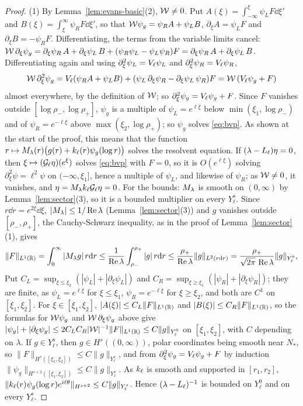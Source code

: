 \begin{proof}
(1) By Lemma~\ref{lem:evans-basic}(2), $\mathcal{W}\ne0$. Put
$A(\xi)=\int_{-\infty}^\xi\psi_LF\dd\xi'$ and $B(\xi)=\int_\xi^\infty\psi_RF\dd\xi'$,
so that $\mathcal{W}\psi_g=\psi_RA+\psi_LB$, $\partial_\xi A=\psi_LF$ and
$\partial_\xi B=-\psi_RF$. Differentiating, the terms from the variable limits
cancel: $\mathcal{W}\,\partial_\xi\psi_g=\partial_\xi\psi_R\,A+\partial_\xi\psi_L\,B+(\psi_R\psi_L-\psi_L\psi_R)F
=\partial_\xi\psi_R\,A+\partial_\xi\psi_L\,B$. Differentiating again and using
$\partial_\xi^2\psi_L=V_\ell\psi_L$ and $\partial_\xi^2\psi_R=V_\ell\psi_R$,
\[
\mathcal{W}\,\partial_\xi^2\psi_g=V_\ell(\psi_RA+\psi_LB)+(\psi_L\,\partial_\xi\psi_R-\partial_\xi\psi_L\,\psi_R)F
=\mathcal{W}\,(V_\ell\psi_g+F)
\]
almost everywhere, by the definition of $\mathcal{W}$; so $\partial_\xi^2\psi_g=V_\ell\psi_g+F$.
Since $F$ vanishes outside $[\log\rho_-,\log\rho_+]$, $\psi_g$ is a multiple of
$\psi_L=e^{\ell\xi}$ below $\min(\xi_1,\log\rho_-)$ and of $\psi_R=e^{-\ell\xi}$ above
$\max(\xi_2,\log\rho_+)$; so $\psi_g$ solves \eqref{eq:bvp}. As shown at the start
of the proof, this means that the function
$r\mapsto M_\lambda(r)\big(g(r)+k_\ell(r)\psi_g(\log r)\big)$ solves the
resolvent equation. If $(\lambda-L_{\ell})\eta=0$, then
$\xi\mapsto(\mathcal{G}_\ell\eta)(e^\xi)$ solves \eqref{eq:bvp} with $F=0$,
so it is $O(e^{\ell\xi})$ solving $\partial_\xi^2\psi=\ell^2\psi$ on $(-\infty,\xi_1]$, hence a
multiple of $\psi_L$, and likewise of $\psi_R$; as $\mathcal{W}\ne0$, it vanishes, and
$\eta=M_\lambda k_\ell\mathcal{G}_\ell\eta=0$. For the bounds: $M_\lambda$ is
smooth on $(0,\infty)$ by Lemma~\ref{lem:sector}(3), so it is a bounded
multiplier on every $Y^s_\ell$. Since $r\dd r=e^{2\xi}\dd\xi$,
$|M_\lambda|\le1/\Re\lambda$ (Lemma~\ref{lem:sector}(3)) and $g$ vanishes outside
$[\rho_-,\rho_+]$, the Cauchy-Schwarz inequality, as in the proof of
Lemma~\ref{lem:sector}(1), gives
\[
\|F\|_{L^1(\mathbb{R})}=\int_0^\infty|M_\lambda g|\,r\dd r
\le\frac1{\Re\lambda}\int_{\rho_-}^{\rho_+}|g|\,r\dd r
\le\frac{\rho_+}{\Re\lambda}\|g\|_{L^2(r\dd r)}
=\frac{\rho_+}{\sqrt{2\pi}\,\Re\lambda}\|g\|_{Y^0_\ell},
\]
Put $C_L=\sup_{\xi\le\xi_2}(|\psi_L|+|\partial_\xi\psi_L|)$ and
$C_R=\sup_{\xi\ge\xi_1}(|\psi_R|+|\partial_\xi\psi_R|)$; they are finite, as
$\psi_L=e^{\ell\xi}$ for $\xi\le\xi_1$, $\psi_R=e^{-\ell\xi}$ for $\xi\ge\xi_2$, and
both are $C^1$ on $[\xi_1,\xi_2]$. For $\xi\in[\xi_1,\xi_2]$,
$|A(\xi)|\le C_L\|F\|_{L^1(\mathbb{R})}$ and $|B(\xi)|\le C_R\|F\|_{L^1(\mathbb{R})}$, so the
formulas for $\mathcal{W}\psi_g$ and $\mathcal{W}\,\partial_\xi\psi_g$ above give
$|\psi_g|+|\partial_\xi\psi_g|\le2C_LC_R|\mathcal{W}|^{-1}\|F\|_{L^1(\mathbb{R})}\le C\|g\|_{Y^0_\ell}$ on
$[\xi_1,\xi_2]$, with $C$ depending on $\lambda$. If $g\in Y^s_\ell$, then
$g\in H^s((0,\infty))$, polar coordinates being smooth near $N_*$, so
$\|F\|_{H^s([\xi_1,\xi_2])}\le C\|g\|_{Y^s_\ell}$, and from $\partial_\xi^2\psi_g=V_\ell\psi_g+F$
by induction $\|\psi_g\|_{H^{s+2}([\xi_1,\xi_2])}\le C\|g\|_{Y^s_\ell}$. As
$k_\ell$ is smooth and supported in $[r_1,r_2]$,
$\|k_\ell(r)\psi_g(\log r)e^{i\ell\theta}\|_{H^{s+2}}\le C\|g\|_{Y^s_\ell}$. Hence
$(\lambda-L_{\ell})^{-1}$ is bounded on $Y^0_\ell$ and on every $Y^s_\ell$.


\end{proof}
